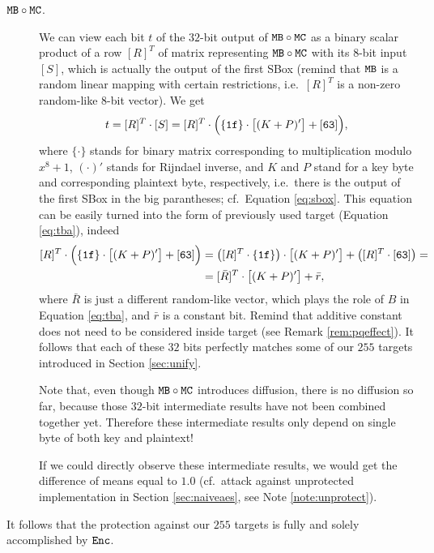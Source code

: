 \begin{description}
	\item[$\texttt{MB}\circ\texttt{MC}$.] We can view each bit $t$ of the $32$-bit output of $\texttt{MB}\circ\texttt{MC}$ as a binary scalar product of a row $[R]^T$ of matrix representing $\texttt{MB}\circ\texttt{MC}$ with its $8$-bit input $[S]$, which is actually the output of the first SBox (remind that $\texttt{MB}$ is a random linear mapping with certain restrictions, i.e.\ $[R]^T$ is a non-zero random-like $8$-bit vector). We get
	\begin{equation}
		t = [R]^T\cdot [S] = [R]^T\cdot\Bigl( \{\texttt{1f}\}\cdot\bigl[(K+P)'\bigr] + [\texttt{63}] \Bigr) ,
	\end{equation}
	where $\{\cdot\}$ stands for binary matrix corresponding to multiplication modulo $x^8+1$, $(\cdot)'$ stands for Rijndael inverse, and $K$ and $P$ stand for a key byte and corresponding plaintext byte, respectively, i.e.\ there is the output of the first SBox in the big parantheses; cf.\ Equation \ref{eq:sbox}. This equation can be easily turned into the form of previously used target (Equation \ref{eq:tba}), indeed
	\begin{align}
	\label{eq:mbmctarget}
		[R]^T\cdot\Bigl( \{\texttt{1f}\}\cdot\bigl[(K+P)'\bigr] + [\texttt{63}] \Bigr) &= \bigl([R]^T\cdot \{\texttt{1f}\}\bigr)\cdot\bigl[(K+P)'\bigr] + \bigl([R]^T\cdot [\texttt{63}]\bigr) = \\
		&= [\bar R]^T \cdot \bigl[(K+P)'\bigr] + \bar r ,
	\end{align}
	where $\bar R$ is just a different random-like vector, which plays the role of $B$ in Equation \ref{eq:tba}, and $\bar r$ is a constant bit. Remind that additive constant does not need to be considered inside target (see Remark \ref{rem:pqeffect}). It follows that each of these $32$ bits perfectly matches some of our $255$ targets introduced in Section \ref{sec:unify}.
	
	Note that, even though $\texttt{MB}\circ\texttt{MC}$ introduces diffusion, there is no diffusion so far, because those $32$-bit intermediate results have not been combined together yet. Therefore these intermediate results only depend on single byte of both key and plaintext!
	
	If we could directly observe these intermediate results, we would get the difference of means equal to $1.0$ (cf.\ attack against unprotected implementation in Section \ref{sec:naiveaes}, see Note \ref{note:unprotect}).
\end{description}
\begin{remark}
\label{rem:enc}
	It follows that the protection against our $255$ targets is fully and solely accomplished by $\texttt{Enc}$.
\end{remark}
